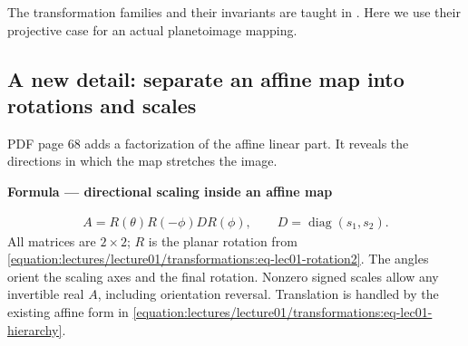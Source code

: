 \documentclass[letterpaper,11pt,english,openany,oneside]{jupyterBook}
\begin{document}
\sphinxAtStartPar
The transformation families and their invariants are taught in {\hyperref[\detokenize{lectures/lecture01/transformations:lec01-transformations}]{}}. Here we use their projective case for an actual plane\sphinxhyphen{}to\sphinxhyphen{}image mapping.


\subsection{A new detail: separate an affine map into rotations and scales}
\label{\detokenize{lectures/lecture02/homographies:a-new-detail-separate-an-affine-map-into-rotations-and-scales}}
\sphinxAtStartPar
PDF page 68 adds a factorization of the affine linear part. It reveals the directions in which the map stretches the image.

\begin{TextbookBox}
\textbf{Formula — directional scaling inside an affine map}\par\smallskip
\begin{equation}\label{equation:lectures/lecture02/homographies:eq-lec02-affine-factors}
\begin{split}A=R(\theta)R(-\phi)D R(\phi),\qquad
D=\operatorname{diag}(s_1,s_2).\end{split}
\end{equation}
\sphinxAtStartPar
All matrices are \(2\times2\); \(R\) is the planar rotation from \eqref{equation:lectures/lecture01/transformations:eq-lec01-rotation2}. The angles orient the scaling axes and the final rotation. Nonzero signed scales allow any invertible real \(A\), including orientation reversal. Translation is handled by the existing affine form in \eqref{equation:lectures/lecture01/transformations:eq-lec01-hierarchy}.

\end{TextbookBox}
\end{document}
